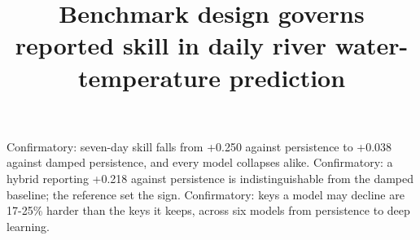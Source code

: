 \title{Benchmark design governs reported skill in daily river water-temperature prediction}



\authorrunninghead{}
\titlerunninghead{}

\keypoints%
    {Confirmatory: seven-day skill falls from +0.250 against persistence to +0.038 against damped persistence, and every model collapses alike.}
    {Confirmatory: a hybrid reporting +0.218 against persistence is indistinguishable from the damped baseline; the reference set the sign.}
    {Confirmatory: keys a model may decline are 17-25\% harder than the keys it keeps, across six models from persistence to deep learning.}

